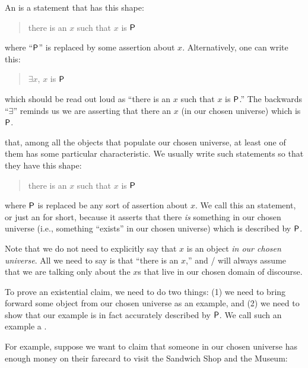 \documentclass[../../../main.tex]{subfiles}
\begin{document}
\begin{terminology}
  An  is a statement that has this shape:
    
  \begin{quote}
    there is an $x$ such that $x$ is $\P/$
  \end{quote}
    
  \noindent
  where ``$\P/$'' is replaced by some assertion about $x$. Alternatively, one can write this:
    
  \begin{quote}
    $\exists x$, $x$ is $\P/$ 
  \end{quote}
    
  \noindent
  which should be read out loud as ``there is an $x$ such that $x$ is $\P/$.'' The backwards ``$\exists$'' reminds us we are asserting that there  an $x$ (in our chosen universe) which is $\P/$.
\end{terminology}

 that, among all the objects that populate our chosen universe, at least one of them has some particular characteristic. We usually write such statements so that they have this shape:

\begin{quote}
  there is an $x$ such that $x$ is $\P/$
\end{quote}

\noindent
where $\P/$ is replaced be any sort of assertion about $x$. We call this an  statement, or just an  for short, because it asserts that there \emph{is} something in our chosen universe (i.e., something ``exists'' in our chosen universe) which is described by $\P/$.

Note that we do not need to explicitly say that $x$ is an object \emph{in our chosen universe}. All we need to say is that ``there is an $x$,'' and \mathers/ will always assume that we are talking only about the $x$s that live in our chosen domain of discourse.


To prove an existential claim, we need to do two things: (1) we need to bring forward some object from our chosen universe as an example, and (2) we need to show that our example is in fact accurately described by $\P/$. We call such an example a .

For example, suppose we want to claim that someone in our chosen universe has enough money on their farecard to visit the Sandwich Shop and the Museum:
\end{document}
